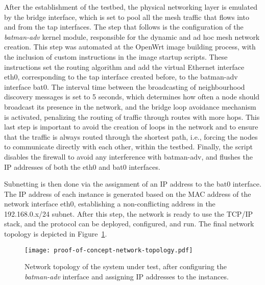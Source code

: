After the establishment of the testbed, the physical networking layer is emulated by the bridge interface, which is set to pool all the mesh traffic that flows into and from the tap interfaces. The step that follows is the configuration of the \emph{batman-adv} kernel module, responsible for the dynamic and ad hoc mesh network creation. This step was automated at the OpenWrt image building process, with the inclusion of custom instructions in the image startup scripts. These instructions set the routing algorithm and add the virtual Ethernet interface eth0, corresponding to the tap interface created before, to the batman-adv interface bat0. The interval time between the broadcasting of neighbourhood discovery messages is set to 5 seconds, which determines how often a node should broadcast its presence in the network, and the bridge loop avoidance mechanism is activated, penalizing the routing of traffic through routes with more hops. This last step is important to avoid the creation of loops in the network and to ensure that the traffic is always routed through the shortest path, i.e., forcing the nodes to communicate directly with each other, within the testbed. Finally, the script disables the firewall to avoid any interference with batman-adv, and flushes the IP addresses of both the eth0 and bat0 interfaces.

Subnetting is then done via the assignment of an IP address to the bat0 interface. The IP address of each instance is generated based on the MAC address of the network interface eth0, establishing a non-conflicting address in the 192.168.0.x/24 subnet. After this step, the network is ready to use the TCP/IP stack, and the \pol{} protocol can be deployed, configured, and run. The final network topology is depicted in Figure~\ref{fig:infrastructure:network-architecture}.

\begin{figure}[h!]
    \begin{center}
    \texttt{[image: proof-of-concept-network-topology.pdf]}
    \caption{Network topology of the system under test, after configuring the \emph{batman-adv} interface and assigning IP addresses to the instances.}
    \label{fig:infrastructure:network-architecture}
    \end{center}
\end{figure}